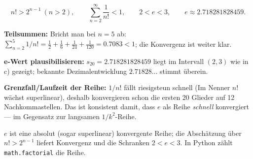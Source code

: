 \begin{ergebnis}
\begin{equation*}
  n!>2^{n-1}\ (n>2),\qquad
  \sum_{n=2}^{\infty}\frac1{n!}<1,\qquad
  2<e<3,\qquad
  e\approx2.\!718281828459 .
\end{equation*}
\end{ergebnis}

\begin{kontrolle}
\textbf{Teilsummen:} Bricht man bei $n=5$ ab: $\sum_{n=2}^5 1/n! =
\frac12+\frac16+\frac1{24}+\frac1{120}=0.7083<1$; die Konvergenz ist
weiter klar.

\textbf{e-Wert plausibilisieren:} $s_{20}=2.718281828459$ liegt im
Intervall $(2,3)$ wie in c) gezeigt; bekannte Dezimalentwicklung
$2.71828\dots$ stimmt \"uberein.

\textbf{Grenzfall/Laufzeit der Reihe:} $1/n!$ f\"allt riesigsteun schnell
(Im Nenner $n!$ w\"achst superlinear), deshalb konvergieren schon die
ersten 20 Glieder auf 12 Nachkommastellen. Das ist konsistent damit,
dass $e$ als Reihe \emph{schnell} konvergiert --- im Gegensatz zur
langsamen $1/k^2$-Reihe.
\end{kontrolle}

\begin{merksatz}
$e$ ist eine absolut (sogar superlinear) konvergente Reihe; die
Absch\"atzung \"uber $n!>2^{n-1}$ liefert Konvergenz und die Schranken
$2<e<3$. In Python z\"ahlt \texttt{math.factorial} die Reihe.
\end{merksatz}
